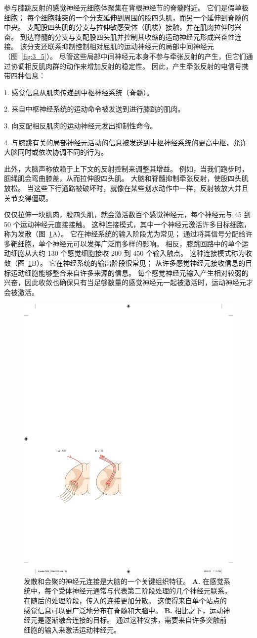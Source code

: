 参与膝跳反射的感觉神经元细胞体聚集在背根神经节的脊髓附近。
它们是假单极细胞；
每个细胞轴突的一个分支延伸到周围的股四头肌，而另一个延伸到脊髓的中央。
支配股四头肌的分支与拉伸敏感受体（肌梭）接触，并在肌肉拉伸时兴奋。 
到达脊髓的分支与支配股四头肌并控制其收缩的运动神经元形成兴奋性连接。 
该分支还联系抑制控制相对屈肌的运动神经元的局部中间神经元（图~\ref{fig:3_5}）。 
尽管这些局部中间神经元本身不参与牵张反射的产生，但它们通过协调相反肌肉群的动作来增加反射的稳定性。 
因此，产生牵张反射的电信号携带四种信息：

1. 感觉信息从肌肉传递到中枢神经系统（脊髓）。

2. 来自中枢神经系统的运动命令被发送到进行膝跳的肌肉。

3. 向支配相反肌肉的运动神经元发出抑制性命令。

4. 与膝跳有关的局部神经元活动的信息被发送到中枢神经系统的更高中枢，允许大脑同时或依次协调不同的行为。


此外，大脑声称依赖于上下文的反射控制来调整其增益。
例如，当我们跑步时，腘绳肌会弯曲膝盖，从而拉伸股四头肌。
大脑和脊髓抑制牵张反射，使股四头肌放松。 
当这些下行通路被破坏时，就像在某些划水动作中一样，反射被放大并且关节变得僵硬。


仅仅拉伸一块肌肉，股四头肌，就会激活数百个感觉神经元，每个神经元与 45 到 50 个运动神经元直接接触。 
这种连接模式，其中一个神经元激活许多目标细胞，称为发散（图~\ref{fig:3_6}A）。 
它在神经系统的输入阶段尤为常见； 通过将其信号分配给许多靶细胞，单个神经元可以发挥广泛而多样的影响。 
相反，膝跳回路中的单个运动细胞从大约 130 个感觉细胞接收 200 到 450 个输入触点。 
这种连接模式称为收敛（图~\ref{fig:3_6}B）。 
它在神经系统的输出阶段很常见； 从许多感觉神经元接收信息的目标运动细胞能够整合来自许多来源的信息。 
每个感觉神经元输入产生相对较弱的兴奋，因此收敛也确保只有当足够数量的感觉神经元一起被激活时，运动神经元才会被激活。


\begin{figure}[htbp]
	\centering
	\includegraphics[width=0.5\linewidth]{chap03/fig_3_6}
	\caption{发散和会聚的神经元连接是大脑的一个关键组织特征。
		\textbf{A.} 在感觉系统中，每个受体神经元通常与代表第二阶段处理的几个神经元联系。 
		在随后的处理阶段，传入的连接更加分散。 
		这使得来自单个站点的感觉信息可以更广泛地分布在脊髓和大脑中。 
		\textbf{B.} 相比之下，运动神经元是逐渐融合连接的目标。 
		通过这种安排，需要来自许多突触前细胞的输入来激活运动神经元。}
	\label{fig:3_6}
\end{figure}


